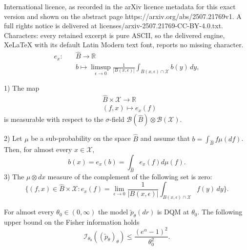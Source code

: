\documentclass[10pt,a4paper]{amsart}
\newcommand{\R}{{\mathbb{R}}}
\newcommand{\cB}{{\mathcal{B}}}
\newcommand{\cI}{{\mathcal{I}}}
\newcommand{\cX}{{\mathcal{X}}}
\begin{document}
International licence, as recorded in the arXiv licence metadata for this exact version and shown on the abstract page https://arxiv.org/abs/2507.21769v1. A full rights notice is delivered at licenses/arxiv-2507.21769-CC-BY-4.0.txt. Characters: every retained excerpt is pure ASCII, so the delivered engine, XeLaTeX with its default Latin Modern text font, reports no missing character.
\begin{align}\nonumber %
e_x : \quad & \widehat{B} \rightarrow \mathbb{R} \\
\label{eq : def evaluation operator}
& b \mapsto \limsup_{\epsilon \to 0} \frac{1}{|B(x, \epsilon)|} \int_{B(x, \epsilon)\cap\cX} b(y) \, dy,
\end{align}

\begin{prop}{\label{p: evaluation}}
	1) The map 
	\begin{align*}
		&\widehat{B}\times \cX \to \R
		\\
		&(f,x) \mapsto e_x(f)
	\end{align*}
	is measurable with respect to the $\sigma$-field $\cB(\widehat{B}) \otimes \cB(\cX)$.
	
	2) Let $\mu$ be a sub-probability on the space $\widehat{B}$ and assume that $b=\int_{\widehat{B}} f \mu(df)$. Then,
	for almost every $x \in \cX$, 
	\begin{equation}\label{eq : evalutation rigorous}
		b(x) =e_x(b) =\int_{\widehat{B}} e_x(f) d\mu (f). 
	\end{equation}
	3) The $\mu \otimes dx$ measure of the complement of the following set is zero:
	\begin{equation} \label{eq : neg by Fubini}
		\big\{(f,x)\in\widehat{B}\times\cX : e_x(f)  = \lim_{\epsilon \to 0} \frac{1}{|B(x, \epsilon)|} \int_{B(x, \epsilon)\cap\cX} f(y) \, dy\big\}.
	\end{equation}
	
	
\end{prop}

\begin{prop}\label{prop : Fisher unif}
	 For almost every $\theta_0 \in (0,\infty)$ the model
	$\tilde{p}_\theta(dr)$ is DQM at $\theta_0$. The following upper bound on the Fisher information holds
	\begin{equation*}
		\cI_{\theta_0}\left((\widetilde{p}_\theta)_\theta\right) \le \frac{(e^\alpha-1)^2}{\theta_0^2}.
	\end{equation*}
\end{prop}
\end{document}

